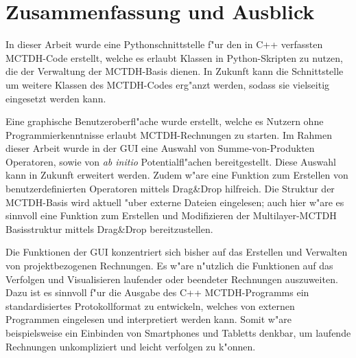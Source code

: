 \chapter{Zusammenfassung und Ausblick}
\label{cha:fazit}

In dieser Arbeit wurde eine Pythonschnittstelle f"ur den in C++ verfassten MCTDH-Code erstellt, 
welche es erlaubt Klassen in Python-Skripten zu nutzen, die der Verwaltung der MCTDH-Basis dienen. 
In Zukunft kann die Schnittstelle um weitere Klassen des MCTDH-Codes erg"anzt werden, sodass sie
vielseitig eingesetzt werden kann.

Eine graphische Benutzeroberfl"ache wurde erstellt, welche es Nutzern ohne Programmierkenntnisse
erlaubt MCTDH-Rechnungen zu starten. Im Rahmen dieser Arbeit wurde in der GUI eine Auswahl von
Summe-von-Produkten Operatoren, sowie von \textit{ab initio} Potentialfl"achen bereitgestellt.
Diese Auswahl kann in Zukunft erweitert werden. Zudem w"are eine Funktion zum Erstellen von
benutzerdefinierten Operatoren mittels Drag\&Drop hilfreich. Die Struktur der MCTDH-Basis
wird aktuell "uber externe Dateien eingelesen; auch hier w"are es sinnvoll eine Funktion zum
Erstellen und Modifizieren der Multilayer-MCTDH Basisstruktur mittels Drag\&Drop bereitzustellen.

Die Funktionen der GUI konzentriert sich bisher auf das Erstellen und Verwalten von
projektbezogenen Rechnungen. Es w"are n"utzlich die Funktionen auf das Verfolgen und Visualisieren
laufender oder beendeter Rechnungen auszuweiten. Dazu ist es sinnvoll f"ur die Ausgabe des C++ 
MCTDH-Programms ein standardisiertes Protokollformat zu entwickeln, welches von externen Programmen eingelesen
und interpretiert werden kann. Somit w"are beispielsweise ein Einbinden von Smartphones und Tabletts
denkbar, um laufende Rechnungen unkompliziert und leicht verfolgen zu k"onnen.

